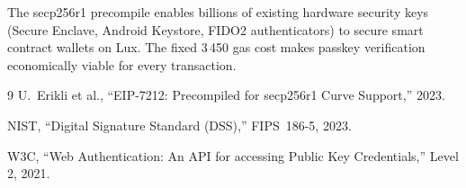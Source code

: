 \documentclass[11pt,a4paper]{article}
\begin{document}
The secp256r1 precompile enables billions of existing hardware security keys
(Secure Enclave, Android Keystore, FIDO2 authenticators) to secure smart
contract wallets on Lux. The fixed 3\,450 gas cost makes passkey verification
economically viable for every transaction.

\begin{thebibliography}{9}
  U.~Erikli et al., ``EIP-7212: Precompiled for secp256r1 Curve Support,'' 2023.

  NIST, ``Digital Signature Standard (DSS),'' FIPS~186-5, 2023.

  W3C, ``Web Authentication: An API for accessing Public Key Credentials,''
  Level 2, 2021.
\end{thebibliography}
\end{document}
